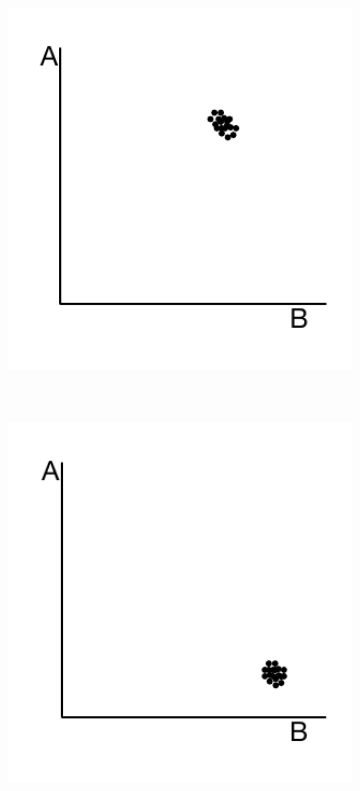 \begin{figure}
\begin{subfigure}[b]{0.3\textwidth}
        \includegraphics[width=1\textwidth]{PolyMarker/Figures/deletions/homFalse.pdf} 
        \caption{}
        \label{fig:poly:homFalse}
    \end{subfigure}
    ~
    \begin{subfigure}[b]{0.3\textwidth}
        \includegraphics[width=1\textwidth]{PolyMarker/Figures/deletions/homReal.pdf}

\end{subfigure}
\end{figure}
